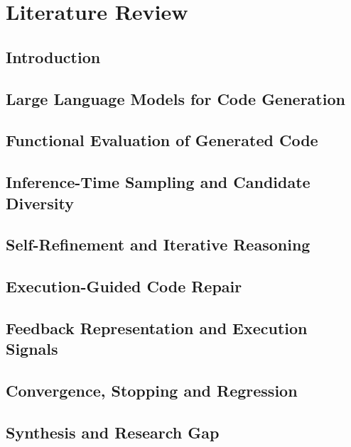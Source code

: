 \chapter{Literature Review}

\section{Introduction}

\section{Large Language Models for Code Generation}

\section{Functional Evaluation of Generated Code}

\section{Inference-Time Sampling and Candidate Diversity}

\section{Self-Refinement and Iterative Reasoning}

\section{Execution-Guided Code Repair}

\section{Feedback Representation and Execution Signals}

\section{Convergence, Stopping and Regression}

\section{Synthesis and Research Gap}
